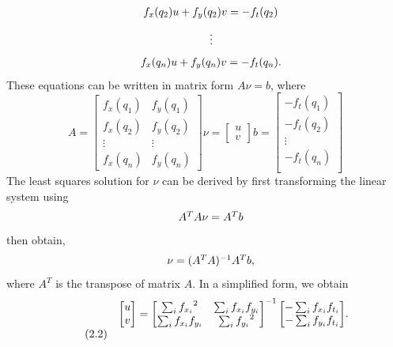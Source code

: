 \[
\begin{array}{lc}
{\rm } & {f_x(q_2)u + f_y(q_2)v} = - f_t(q_2) \\ 
\end{array}
\]
\[
\begin{array}{lc}
{\rm } & \vdots \\ 
\end{array}
\]
\[
\begin{array}{lc}
{\rm } & {f_x(q_n)u + f_y(q_n)v} = - f_t(q_n). \\ 
\end{array}
\]
These equations can be written in matrix form $A\nu = b$, where
\[
A = \begin{bmatrix}
f_x(q_1) & f_y(q_1)\\
f_x(q_2) & f_y(q_2)\\
\vdots&\vdots\\
f_x(q_n) & f_y(q_n)
\end{bmatrix}
\nu = \begin{bmatrix}
u \\
v
\end{bmatrix}
b= \begin{bmatrix}
-f_t(q_1)\\
-f_t(q_2)\\
\vdots \\
-f_t(q_n)\\
\end{bmatrix}
\]
The least squares solution for $\nu$ can be derived by first transforming the linear system using  
\[
\begin{array}{lc}
{\rm } & {A^TA\nu = A^Tb} \\ 
\end{array}
\]
then obtain,
\[
\begin{array}{lc}
{\rm } &  {\nu = (A^TA)^{-1} A^Tb}, \\ 
\end{array}
\]
where $A^T$ is the transpose of matrix $A$. In a simplified form, we obtain
\[
\begin{array}{lc}
{\rm } & {  \begin{bmatrix} u \\ v \end{bmatrix} = \begin{bmatrix} \sum_{i}{f_{x_i}}^2 & \sum_{i}{f_{x_i} f_{y_i} } \\ \sum_{i}{f_{x_i} f_{y_i}} & \sum_{i}{f_{y_i}}^2 \end{bmatrix}^{-1} \begin{bmatrix} - \sum_{i}{f_{x_i} f_{t_i}} \\ - \sum_{i}{f_{y_i} f_{t_i}} \end{bmatrix}  }.\\ \tag{2.2}
\label{eq:2.2}
\end{array}
\]


